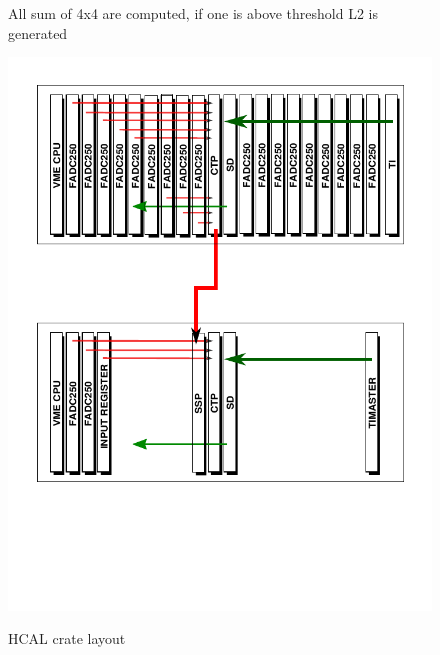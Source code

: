 \documentclass{article}
\begin{document}
\begin{figure}
  \centering
  \caption{All sum of 4x4 are computed, if one is above threshold L2 is generated }
\end{figure}

\begin{figure}
  \centering
  \includegraphics[width=\textwidth]{figs/VXSHCalFADC.pdf}\\
  \caption{HCAL crate layout }\label{fig:HCALFADC}
\end{figure}
\end{document}

